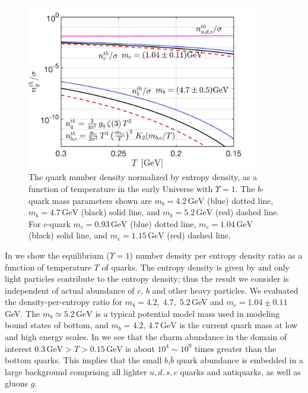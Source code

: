 \begin{figure}
\centerline{\includegraphics[width=0.9\textwidth]{./plots/bcQuarkDensity_new}}
\caption{
The quark number density normalized by entropy density, as a function of temperature in the early Universe with $\Upsilon=1$. The $b$-quark mass parameters shown are $m_b=4.2\,\mathrm{GeV}$ (blue) dotted line, $m_b=4.7\,\mathrm{GeV}$ (black) solid line, and $m_b=5.2\,\mathrm{GeV}$ (red) dashed line. For  $c$-quark  $m_c=0.93\,\mathrm{GeV}$  (blue) dotted line, $m_c=1.04\,\mathrm{GeV}$ (black) solid line, and $m_c=1.15\,\mathrm{GeV}$ (red) dashed line. }
\label{number_entropy_b002} 
\end{figure}

In  we show the equilibrium ($\Upsilon=1$) number density per entropy density  ratio as a function of temperature $T$ of quarks. The entropy density is given by  and only light particles contribute to the entropy density; thus the result we consider is independent of actual abundance of $c$, $b$ and other heavy particles. We evaluated the density-per-entropy ratio for  $m_b=4.2,\;4.7,\;5.2$\,GeV and $m_c=1.04\pm0.11$\,GeV. The $m_b\simeq 5.2\,\mathrm{GeV}$ is  a typical potential model mass used in modeling bound states of bottom, and $m_b=4.2,\,4.7\,\mathrm{GeV}$ is the current quark mass at low and high energy scales. In  we see that the charm abundance in the domain of interest $0.3\,\mathrm{GeV}>T>0.15\,\mathrm{GeV}$ is about $10^4\sim\!\!10^{9}$ times greater than the bottom quarks. This implies that the small $b$,$\bar b$ quark abundance is embedded in a large background comprising all lighter $u,d,s,c$ quarks and antiquarks, as well as gluons $g$.

